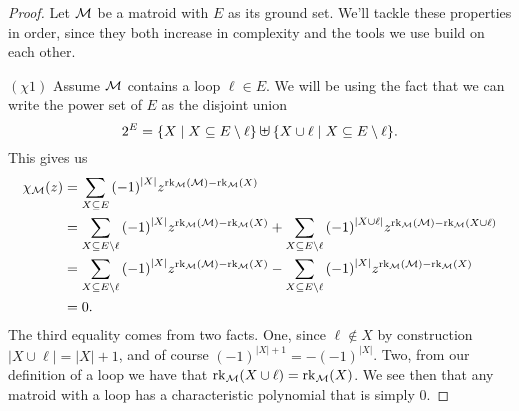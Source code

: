 \documentclass[12pt,oneside]{../../sfsuthesis}
\begin{document}
\begin{proof}
    Let \( \mathcal{M} \) be a matroid with \( E \) as its ground set.
    We'll tackle these properties in order, since they both increase in complexity and the tools we use build on each other.

    \( (\chi 1 ) \) Assume \( \mathcal{M} \) contains a loop \( \ell \in E \).
    We will be using the fact that we can write the power set of \( E \) as the disjoint union
    \[
        2^E = \{ X \; | \; X \subseteq E\setminus \ell \}\, \mathlarger{\uplus} \,\{ X \cup \ell \; | \; X \subseteq E\setminus \ell \}.
    \]
    This gives us
    \begin{align*}
        \chi_{\mathcal{M}}(z) & = \sum_{X \subseteq E} {(-1)}^{|X|}z^{\operatorname{rk}_{\mathcal{M}}(\mathcal{M}) - \operatorname{rk}_{\mathcal{M}}(X)}                                                                                                                     \\
                    & =  \sum_{X \subseteq E\setminus \ell} {(-1)}^{|X|}z^{\operatorname{rk}_{\mathcal{M}}(\mathcal{M}) - \operatorname{rk}_{\mathcal{M}}(X)} +  \sum_{X \subseteq E \setminus \ell} {(-1)}^{|X \cup \ell|}z^{\operatorname{rk}_{\mathcal{M}}(\mathcal{M}) - \operatorname{rk}_{\mathcal{M}}(X \cup \ell)} \\
                    & = \sum_{X \subseteq E\setminus \ell} {(-1)}^{|X|}z^{\operatorname{rk}_{\mathcal{M}}(\mathcal{M}) - \operatorname{rk}_{\mathcal{M}}(X)} -  \sum_{X \subseteq E \setminus \ell} {(-1)}^{|X|}z^{\operatorname{rk}_{\mathcal{M}}(\mathcal{M}) - \operatorname{rk}_{\mathcal{M}}(X)}                      \\
                    & = 0.
    \end{align*}
    The third equality comes from two facts.
    One, since \( \ell \notin X \) by construction \( | X \cup \ell | = | X | + 1 \), and of course \( (-1)^{ |X| + 1 } = -(-1)^{|X|} \).
    Two, from our definition of a loop we have that  \( \operatorname{rk}_{\mathcal{M}}(X \cup \ell) = \operatorname{rk}_{\mathcal{M}}(X) \).
    We see then that any matroid with a loop has a characteristic polynomial that is simply 0.


\end{proof}
\end{document}
